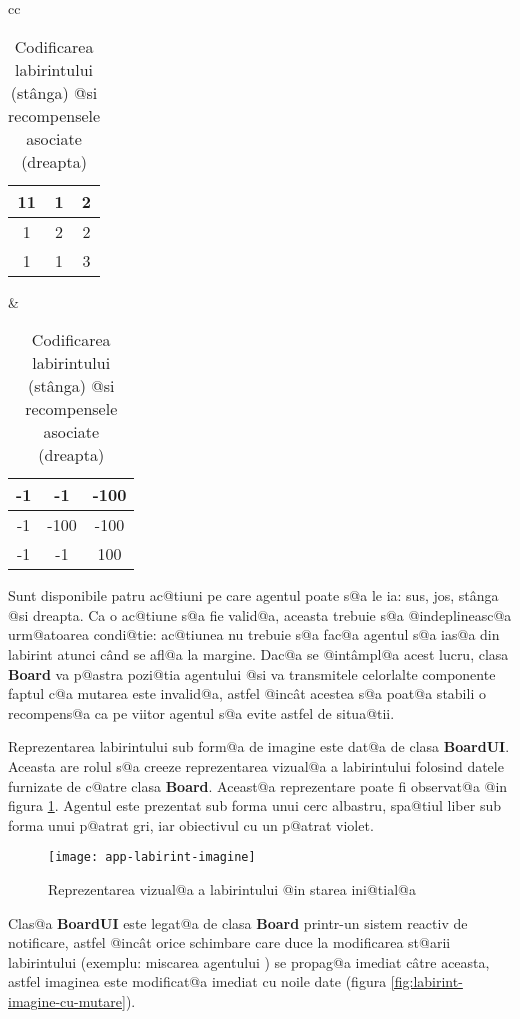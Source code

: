 \begin{table}[h]
	\begin{center}
		\begin{tabular}{cc}
			\begin{tabular}{|c|c|c|}
				\hline
				11 & 1 & 2 \\
				\hline
				1 & 2 & 2 \\
				\hline
				1 & 1 & 3 \\
				\hline
			\end{tabular} & 
			\begin{tabular}{|c|c|c|}
				\hline
				-1 & -1 & -100 \\
				\hline
				-1 & -100 & -100 \\
				\hline
				-1 & -1 & 100 \\
				\hline
			\end{tabular}
		\end{tabular}
	\end{center}
	\caption{Codificarea labirintului (st\^ anga) @si recompensele asociate (dreapta)}
	\label{tab:recompense-lab}
\end{table}

Sunt disponibile patru ac@tiuni pe care agentul poate s@a le ia: sus, jos, st\^ anga @si dreapta. Ca o ac@tiune s@a fie valid@a, aceasta trebuie s@a @indeplineasc@a urm@atoarea condi@tie: ac@tiunea nu trebuie s@a fac@a agentul s@a ias@a din labirint atunci c\^ and se afl@a la margine. Dac@a se @int\^ ampl@a acest lucru, clasa {\bf Board} va p@astra pozi@tia agentului @si va transmitele celorlalte componente faptul c@a mutarea este invalid@a, astfel @inc\^ at acestea s@a poat@a stabili o recompens@a ca pe viitor agentul s@a evite astfel de situa@tii.

Reprezentarea labirintului sub form@a de imagine este dat@a de clasa \textbf{BoardUI}. Aceasta are rolul s@a creeze reprezentarea vizual@a a labirintului folosind datele furnizate de c@atre clasa \textbf{Board}. Aceast@a reprezentare poate fi observat@a @in figura \ref{fig:labirint-imagine}. Agentul este prezentat sub forma unui cerc albastru, spa@tiul liber sub forma unui p@atrat gri, iar obiectivul cu un p@atrat violet.

\begin{figure}[h]
	\centering
	\texttt{[image: app-labirint-imagine]}
	\caption{Reprezentarea vizual@a a labirintului @in starea ini@tial@a}
	\label{fig:labirint-imagine}
\end{figure}


Clas@a \textbf{BoardUI} este legat@a de clasa \textbf{Board} printr-un sistem reactiv de notificare, astfel @inc\^ at orice schimbare care duce la modificarea st@arii labirintului (exemplu: miscarea agentului ) se propag@a imediat c\^ atre aceasta, astfel imaginea este modificat@a imediat cu noile date (figura \ref{fig:labirint-imagine-cu-mutare}).

